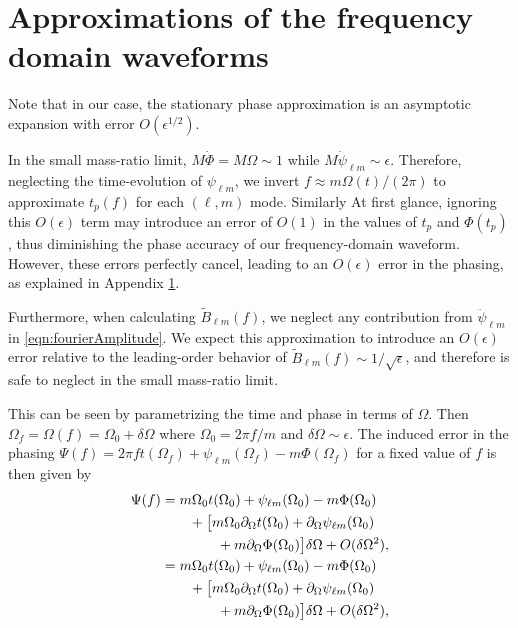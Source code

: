 \documentclass[%
 reprint,
 nofootinbib,
 amsmath,amssymb,
 aps,
 prd,
]{revtex4-2}
\begin{document}
\appendix

\section{Approximations of the frequency domain waveforms}
\label{app:fourierPhase}

Note that in our case, the stationary phase approximation is an asymptotic expansion with error $O(\epsilon^{1/2})$.

In the small mass-ratio limit, $M\dot{\Phi} = M\Omega \sim 1$ while $M \dot{\psi}_{\ell m} \sim \epsilon$. Therefore, neglecting the time-evolution of ${\psi}_{\ell m}$, we invert $f\approx m\Omega(t)/(2\pi)$ to approximate $t_p(f)$ for each $(\ell, m)$ mode. Similarly  At first glance, ignoring this $O(\epsilon)$ term may introduce an error of $O(1)$ in the values of $t_p$ and $\Phi(t_p)$, thus diminishing the phase accuracy of our frequency-domain waveform. However, these errors perfectly cancel, leading to an $O(\epsilon)$ error in the phasing, as explained in Appendix \ref{app:fourierPhase}.

Furthermore, when calculating $\tilde{B}_{\ell m}(f)$, we neglect any contribution from $\ddot{\psi}_{\ell m}$ in \eqref{eqn:fourierAmplitude}. We expect this approximation to introduce an $O(\epsilon)$ error relative to the leading-order behavior of $\tilde{B}_{\ell m}(f) \sim 1/\sqrt{\epsilon}$, and therefore is safe to neglect in the small mass-ratio limit.

This can be seen by parametrizing the time and phase in terms of $\Omega$. Then $\Omega_f = \Omega(f) = \Omega_0 + \delta\Omega$ where $\Omega_0 = 2\pi f/m$ and $\delta\Omega \sim \epsilon$. The induced error in the phasing $\Psi(f) = 2\pi f t(\Omega_f) + \psi_{\ell m}(\Omega_f) - m\Phi(\Omega_f)$ for a fixed value of $f$ is then given by
\begin{align}
    \Psi(f) &=
    m\Omega_0 t(\Omega_0) + \psi_{\ell m}(\Omega_0) - m\Phi(\Omega_0) 
    \\ \notag
    & \qquad + \big[m\Omega_0 \partial_\Omega t(\Omega_0) + \partial_\Omega\psi_{\ell m}(\Omega_0) 
    \\ \notag
    & \qquad \qquad + m\partial_\Omega\Phi(\Omega_0)\big]\delta \Omega + O(\delta\Omega^2),
    \\
    &=
    m\Omega_0 t(\Omega_0) + \psi_{\ell m}(\Omega_0) - m\Phi(\Omega_0) 
    \\ \notag
    & \qquad + \big[m\Omega_0 \partial_\Omega t(\Omega_0) + \partial_\Omega\psi_{\ell m}(\Omega_0) 
    \\ \notag
    & \qquad \qquad + m\partial_\Omega\Phi(\Omega_0)\big]\delta \Omega + O(\delta\Omega^2),
\end{align}
\end{document}
